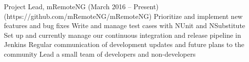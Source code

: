 Project Lead, mRemoteNG (March 2016 – Present)
(https://github.com/mRemoteNG/mRemoteNG)
Prioritize and implement new features and bug fixes
Write and manage test cases with NUnit and NSubstitute
Set up and currently manage our continuous integration and release pipeline in Jenkins
Regular communication of development updates and future plans to the community
Lead a small team of developers and non-developers